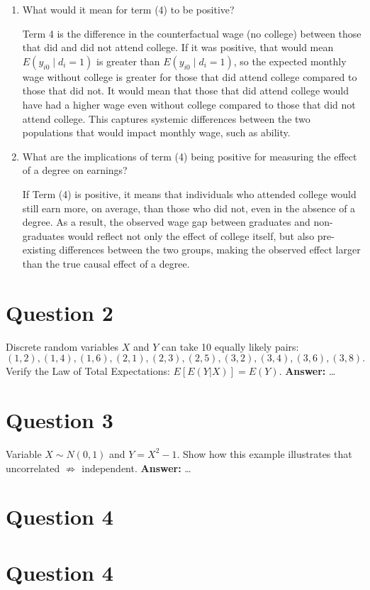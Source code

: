 \documentclass[12pt,a4paper]{article}
\begin{document}
\begin{enumerate}[label=(\alph*)]
  \item What would it mean for term (4) to be positive?

  Term 4 is the difference in the counterfactual wage (no college) between those that did and did not attend college. If it was positive, that would mean $E(y_{i0} \mid d_i = 1)$ is greater than $E(y_{i0} \mid d_i = 1)$, so the expected monthly wage without college is greater for those that did attend college compared to those that did not. It would mean that those that did attend college would have had a higher wage even without college compared to those that did not attend college. This captures systemic differences between the two populations that would impact monthly wage, such as ability.
  
  \item What are the implications of term (4) being positive for measuring the effect of a degree on earnings?

 If Term (4) is positive, it means that individuals who attended college would still earn more, on average, than those who did not, even in the absence of a degree. As a result, the observed wage gap between graduates and non-graduates would reflect not only the effect of college itself, but also pre-existing differences between the two groups, making the observed effect larger than the true causal effect of a degree.
 
\end{enumerate}

\section*{Question 2}
Discrete random variables $X$ and $Y$ can take 10 equally likely pairs:
\[
(1, 2), (1, 4), (1, 6), (2, 1), (2, 3), (2, 5), (3, 2), (3, 4), (3, 6), (3, 8).
\]
Verify the Law of Total Expectations: $E[E(Y|X)] = E(Y)$.  
\textbf{Answer:} \ldots

\section*{Question 3}
Variable $X \sim N(0,1)$ and $Y = X^2 - 1$. Show how this example illustrates that uncorrelated $\not\Rightarrow$ independent.  
\textbf{Answer:} \ldots

\section*{Question 4}

\section*{Question 4}
\end{document}
